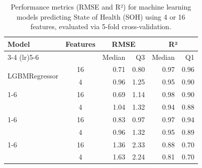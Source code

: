 \begin{table}[H]
    \centering
    \caption{Performance metrics (RMSE and R²) for machine learning models predicting State of Health (SOH) using 4 or 16 features, evaluated via 5-fold cross-validation.}
    \label{tab:soh_metrics}
    \begin{tabular}{lcrrrr}
    \toprule
    Model & Features & \multicolumn{2}{c}{RMSE} & \multicolumn{2}{c}{R²} \\
    \cmidrule(lr){3-4} \cmidrule(lr){5-6}
          &          & Median & Q3 & Median & Q1 \\
    \midrule
    \multirow{2}{*}{LGBMRegressor}       & 16 & 0.71 & 0.80 & 0.97 & 0.96 \\
                                         & 4  & 0.96 & 1.25 & 0.95 & 0.90 \\
    \cmidrule{1-6}
    \multirow{2}{*}{KNeighborsRegressor} & 16 & 0.69 & 1.14 & 0.98 & 0.90 \\
                                         & 4  & 1.04 & 1.32 & 0.94 & 0.88 \\
    \cmidrule{1-6}
    \multirow{2}{*}{ExtraTreesRegressor} & 16 & 0.83 & 0.97 & 0.97 & 0.94 \\
                                         & 4  & 0.96 & 1.32 & 0.95 & 0.89 \\
    \cmidrule{1-6}
    \multirow{2}{*}{TweedieRegressor}    & 16 & 1.36 & 2.33 & 0.88 & 0.70 \\
                                         & 4  & 1.63 & 2.24 & 0.81 & 0.70 \\
    \bottomrule
    \end{tabular}
\end{table}

